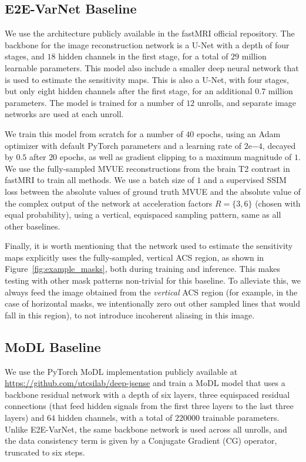 \documentclass{article}
\newcounter{example}[section]
\begin{document}
\subsection{E2E-VarNet Baseline}
We use the architecture publicly available in the fastMRI official repository. The backbone for the image reconstruction network is a U-Net with a depth of four stages, and $18$ hidden channels in the first stage, for a total of $29$ million learnable parameters. This model also include a smaller deep neural network that is used to estimate the sensitivity maps. This is also a U-Net, with four stages, but only eight hidden channels after the first stage, for an additional $0.7$ million parameters. The model is trained for a number of $12$ unrolls, and separate image networks are used at each unroll.

We train this model from scratch for a number of $40$ epochs, using an Adam optimizer with default PyTorch parameters and a learning rate of $2\mathrm{e}{-4}$, decayed by $0.5$ after $20$ epochs, as well as gradient clipping to a maximum magnitude of $1$. We use the fully-sampled MVUE reconstructions from the brain T2 contrast in fastMRI to train all methods. We use a batch size of $1$ and a supervised SSIM loss between the absolute values of ground truth MVUE and the absolute value of the complex output of the network at acceleration factors $R=\{3,6\}$ (chosen with equal probability), using a vertical, equispaced sampling pattern, same as all other baselines.

Finally, it is worth mentioning that the network used to estimate the sensitivity maps explicitly uses the fully-sampled, vertical ACS region, as shown in Figure~\ref{fig:example_masks}, both during training and inference. This makes testing with other mask patterns non-trivial for this baseline. To alleviate this, we always feed the image obtained from the \textit{vertical} ACS region (for example, in the case of horizontal masks, we intentionally zero out other sampled lines that would fall in this region), to not introduce incoherent aliasing in this image.

\subsection{MoDL Baseline}
We use the PyTorch MoDL implementation publicly available at \url{https://github.com/utcsilab/deep-jsense} and train a MoDL model that uses a backbone residual network with a depth of six layers, three equispaced residual connections (that feed hidden signals from the first three layers to the last three layers) and $64$ hidden channels, with a total of $220000$ trainable parameters. Unlike E2E-VarNet, the same backbone network is used across all unrolls, and the data consistency term is given by a Conjugate Gradient (CG) operator, truncated to six steps.
\end{document}
